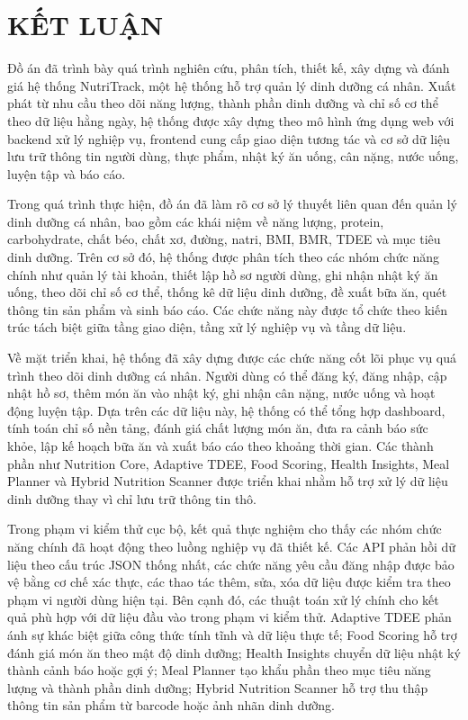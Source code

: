 \documentclass[12pt, a4paper]{report}
\begin{document}
\chapter*{KẾT LUẬN}
Đồ án đã trình bày quá trình nghiên cứu, phân tích, thiết kế, xây dựng và đánh giá hệ thống NutriTrack, một hệ thống hỗ trợ quản lý dinh dưỡng cá nhân. Xuất phát từ nhu cầu theo dõi năng lượng, thành phần dinh dưỡng và chỉ số cơ thể theo dữ liệu hằng ngày, hệ thống được xây dựng theo mô hình ứng dụng web với backend xử lý nghiệp vụ, frontend cung cấp giao diện tương tác và cơ sở dữ liệu lưu trữ thông tin người dùng, thực phẩm, nhật ký ăn uống, cân nặng, nước uống, luyện tập và báo cáo.

Trong quá trình thực hiện, đồ án đã làm rõ cơ sở lý thuyết liên quan đến quản lý dinh dưỡng cá nhân, bao gồm các khái niệm về năng lượng, protein, carbohydrate, chất béo, chất xơ, đường, natri, BMI, BMR, TDEE và mục tiêu dinh dưỡng. Trên cơ sở đó, hệ thống được phân tích theo các nhóm chức năng chính như quản lý tài khoản, thiết lập hồ sơ người dùng, ghi nhận nhật ký ăn uống, theo dõi chỉ số cơ thể, thống kê dữ liệu dinh dưỡng, đề xuất bữa ăn, quét thông tin sản phẩm và sinh báo cáo. Các chức năng này được tổ chức theo kiến trúc tách biệt giữa tầng giao diện, tầng xử lý nghiệp vụ và tầng dữ liệu.

Về mặt triển khai, hệ thống đã xây dựng được các chức năng cốt lõi phục vụ quá trình theo dõi dinh dưỡng cá nhân. Người dùng có thể đăng ký, đăng nhập, cập nhật hồ sơ, thêm món ăn vào nhật ký, ghi nhận cân nặng, nước uống và hoạt động luyện tập. Dựa trên các dữ liệu này, hệ thống có thể tổng hợp dashboard, tính toán chỉ số nền tảng, đánh giá chất lượng món ăn, đưa ra cảnh báo sức khỏe, lập kế hoạch bữa ăn và xuất báo cáo theo khoảng thời gian. Các thành phần như Nutrition Core, Adaptive TDEE, Food Scoring, Health Insights, Meal Planner và Hybrid Nutrition Scanner được triển khai nhằm hỗ trợ xử lý dữ liệu dinh dưỡng thay vì chỉ lưu trữ thông tin thô.

Trong phạm vi kiểm thử cục bộ, kết quả thực nghiệm cho thấy các nhóm chức năng chính đã hoạt động theo luồng nghiệp vụ đã thiết kế. Các API phản hồi dữ liệu theo cấu trúc JSON thống nhất, các chức năng yêu cầu đăng nhập được bảo vệ bằng cơ chế xác thực, các thao tác thêm, sửa, xóa dữ liệu được kiểm tra theo phạm vi người dùng hiện tại. Bên cạnh đó, các thuật toán xử lý chính cho kết quả phù hợp với dữ liệu đầu vào trong phạm vi kiểm thử. Adaptive TDEE phản ánh sự khác biệt giữa công thức tính tĩnh và dữ liệu thực tế; Food Scoring hỗ trợ đánh giá món ăn theo mật độ dinh dưỡng; Health Insights chuyển dữ liệu nhật ký thành cảnh báo hoặc gợi ý; Meal Planner tạo khẩu phần theo mục tiêu năng lượng và thành phần dinh dưỡng; Hybrid Nutrition Scanner hỗ trợ thu thập thông tin sản phẩm từ barcode hoặc ảnh nhãn dinh dưỡng.
\end{document}
